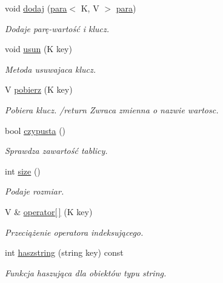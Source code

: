 \begin{DoxyCompactItemize}
\item 
void \hyperlink{class_tablica_a0a464464849e65aea53ff0e764a739bc}{dodaj} (\hyperlink{classpara}{para}$<$ \-K, \-V $>$ \hyperlink{classpara}{para})
\begin{DoxyCompactList}\small\item\em \-Dodaje parę-\/wartość i klucz. \end{DoxyCompactList}\item 
void \hyperlink{class_tablica_a50917fdbcda74752cc30fc9787c399dd}{usun} (\-K key)
\begin{DoxyCompactList}\small\item\em \-Metoda usuwajaca klucz. \end{DoxyCompactList}\item 
\-V \hyperlink{class_tablica_a84743a213a825338a8735554f210a4c5}{pobierz} (\-K key)
\begin{DoxyCompactList}\small\item\em \-Pobiera klucz. /return \-Zwraca zmienna o nazwie wartosc. \end{DoxyCompactList}\item 
bool \hyperlink{class_tablica_acc06181d0ddc8a5c74c2c61bfa5124c7}{czypusta} ()
\begin{DoxyCompactList}\small\item\em \-Sprawdza zawartość tablicy. \end{DoxyCompactList}\item 
int \hyperlink{class_tablica_ae79233d7bc3b2cb492ad6dc3d6c26474}{size} ()
\begin{DoxyCompactList}\small\item\em \-Podaje rozmiar. \end{DoxyCompactList}\item 
\-V \& \hyperlink{class_tablica_ad042e6efd390bd76ff6e68b17502525e}{operator\mbox{[}$\,$\mbox{]}} (\-K key)
\begin{DoxyCompactList}\small\item\em \-Przeciążenie operatora indeksującego. \end{DoxyCompactList}\item 
int \hyperlink{class_tablica_afe32d999b668832f95bfe393ce239da4}{haszstring} (string key) const 
\begin{DoxyCompactList}\small\item\em \-Funkcja haszująca dla obiektów typu string. \end{DoxyCompactList}\end{DoxyCompactItemize}
